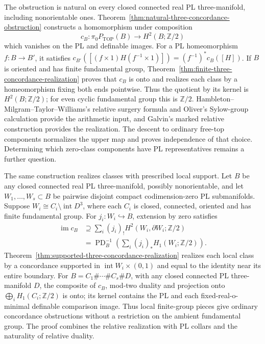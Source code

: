 \documentclass[11pt,a4paper]{article}
\theoremstyle{definition}
\begin{document}
The obstruction is natural on every closed connected real PL
three-manifold, including nonorientable ones.
Theorem~\ref{thm:natural-three-concordance-obstruction} constructs
a homomorphism under composition
\[
 c_B:\pi_0P_{\mathrm{TOP}}(B)\longrightarrow H^2(B;\mathbb Z/2)
\]
which vanishes on the PL and definable images. For a PL homeomorphism
$f:B\to B'$, it satisfies
$c_{B'}([(f\times1)H(f^{-1}\times1)])=(f^{-1})^*c_B([H])$.
If $B$ is oriented and has finite fundamental group,
Theorem~\ref{thm:finite-three-concordance-realization} proves that
$c_B$ is onto and realizes each class by a homeomorphism fixing
both ends pointwise. Thus the quotient by its kernel is
$H^2(B;\mathbb Z/2)$; for even cyclic fundamental group this is
$\mathbb Z/2$. Hambleton--Milgram--Taylor--Williams's relative
surgery formula and Oliver's Sylow-group calculation provide
the arithmetic input, and Galvin's marked relative construction
provides the realization. The descent to ordinary free-top
components normalizes the upper map and proves independence
of that choice. Determining which zero-class components have
PL representatives remains a further question.

The same construction realizes classes with prescribed local support.
Let $B$ be any closed connected real PL three-manifold, possibly
nonorientable, and let $W_1,\ldots,W_s\subset B$ be pairwise
disjoint compact codimension-zero PL submanifolds. Suppose
$W_i\cong C_i\setminus\operatorname{int}D^3$, where each $C_i$
is closed, connected, oriented and has finite fundamental group.
For $j_i:W_i\hookrightarrow B$, extension by zero satisfies
\[
\begin{split}
\operatorname{im}c_B
&\supseteq\sum_i(j_i)_!H^2(W_i,\partial W_i;\mathbb Z/2)\\
&=\operatorname{PD}_B^{-1}
       \left(\sum_i(j_i)_*H_1(W_i;\mathbb Z/2)\right).
\end{split}
\]
Theorem~\ref{thm:supported-three-concordance-realization}
realizes each local class by a concordance supported in
$\operatorname{int}W_i\times(0,1)$ and equal to the identity
near its entire boundary. For
$B=C_1\#\cdots\#C_s\#D$, with any closed connected PL
three-manifold $D$, the composite of $c_B$, mod-two duality
and projection onto $\bigoplus_iH_1(C_i;\mathbb Z/2)$ is onto;
its kernel contains the PL and each fixed-real-o-minimal
definable comparison image. Thus local finite-group pieces
give ordinary concordance obstructions without a restriction
on the ambient fundamental group. The proof combines the
relative realization with PL collars and the naturality of
relative duality.
\end{document}
